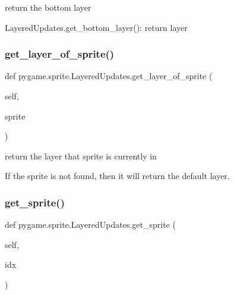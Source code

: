 \begin{DoxyVerb}return the bottom layer

LayeredUpdates.get_bottom_layer(): return layer\end{DoxyVerb}
 \mbox{\label{classpygame_1_1sprite_1_1_layered_updates_ab6d708ad4ba770ff7df5b6ec3150eb57}} 
\subsubsection{\texorpdfstring{get\+\_\+layer\+\_\+of\+\_\+sprite()}{get\_layer\_of\_sprite()}}
{\footnotesize\ttfamily def pygame.\+sprite.\+Layered\+Updates.\+get\+\_\+layer\+\_\+of\+\_\+sprite (\begin{DoxyParamCaption}\item[{}]{self,  }\item[{}]{sprite }\end{DoxyParamCaption})}

\begin{DoxyVerb}return the layer that sprite is currently in

If the sprite is not found, then it will return the default layer.\end{DoxyVerb}
 \mbox{\label{classpygame_1_1sprite_1_1_layered_updates_ae073cc5bfd5bc8cc40c0c5b2445214ac}} 
\subsubsection{\texorpdfstring{get\+\_\+sprite()}{get\_sprite()}}
{\footnotesize\ttfamily def pygame.\+sprite.\+Layered\+Updates.\+get\+\_\+sprite (\begin{DoxyParamCaption}\item[{}]{self,  }\item[{}]{idx }\end{DoxyParamCaption})}


